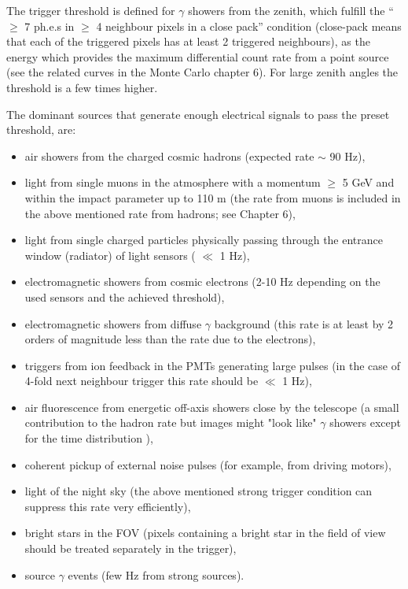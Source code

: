 The trigger threshold is defined for $\gamma $ showers from the zenith,
which fulfill the ``$ \geq $ 7 ph.e.s in $\geq $ 4 neighbour pixels 
in a close pack'' condition (close-pack means that each of the
triggered pixels has at least 2 triggered neighbours),
as the energy which provides the maximum differential count rate 
from a point source (see the related curves in the Monte Carlo chapter 6). 
For large zenith angles the threshold is a few times higher.

The dominant sources that generate enough electrical signals to pass the
preset threshold, are:

\begin{itemize}
\item  air showers from the charged cosmic hadrons (expected 
rate $\sim$ 90 Hz),

\item  \Cerenkov light from single muons in the atmosphere 
with a momentum $\geq$ 5 GeV and
within the impact parameter up to 110 m (the rate from muons
is included in the above mentioned rate from hadrons; see Chapter 6),

\item \Cerenkov light from single charged particles physically passing 
through the entrance window (radiator) of light sensors ( $\ll$ 1 Hz),

\item  electromagnetic showers from cosmic electrons (2-10 Hz depending
on the used sensors and the achieved threshold),

\item electromagnetic showers from diffuse $\gamma$ background (this rate
is at least by 2 orders of magnitude less than the rate due to the electrons),

\item  triggers from ion feedback in the PMTs generating large pulses (in
the case of 4-fold next neighbour trigger this rate should be $\ll$ 1 Hz),

\item  air fluorescence from energetic 
off-axis showers close by the telescope 
(a small contribution to the hadron rate but images 
might "look like" $\gamma$ showers except for
the time distribution ),

\item  coherent pickup of external noise pulses (for example, from 
driving motors),

\item  light of the night sky (the above mentioned strong trigger 
condition can suppress this rate very efficiently),

\item  bright stars in the FOV (pixels containing a bright star in
the field of view should be treated separately in the trigger),

\item  source $\gamma$ events (few Hz from strong sources).
\end{itemize}

